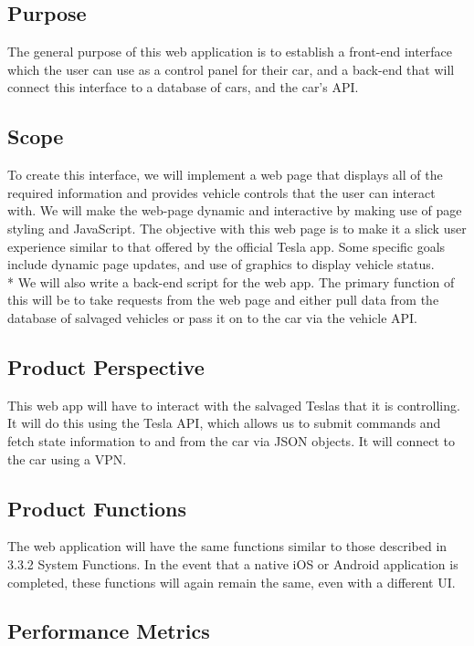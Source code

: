 \documentclass[onecolumn, draftclsnofoot,10pt, compsoc]{IEEEtran}
\begin{document}
\subsection{Purpose}
The general purpose of this web application is to establish a front-end interface which the user can use as a control panel for their car, and a back-end that will connect this interface to a database of cars, and the car's API\cite{1}.

\subsection{Scope}
To create this interface, we will implement a web page that displays all of the required information and provides vehicle controls that the user can interact with. 
We will make the web-page dynamic and interactive by making use of page styling and JavaScript.
The objective with this web page is to make it a slick user experience similar to that offered by the official Tesla app. 
Some specific goals include dynamic page updates, and use of graphics to display vehicle status.\\*
We will also write a back-end script for the web app.
The primary function of this will be to take requests from the web page and either pull data from the database of salvaged vehicles or pass it on to the car via the vehicle API.

\subsection{Product Perspective}
This web app will have to interact with the salvaged Teslas that it is controlling. It will do this using the Tesla API, which allows us to submit commands and fetch state information to and from the car via JSON objects. It will connect to the car using a VPN.

\subsection{Product Functions}
The web application will have the same functions similar to those described in 3.3.2 System Functions. In the event that a native iOS or Android application is completed, these functions will again remain the same, even with a different UI. 

\subsection{Performance Metrics}
\end{document}
